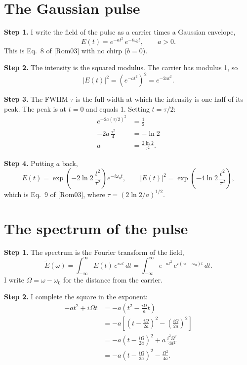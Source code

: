 \documentclass[11pt]{article}
\begin{document}
\section{The Gaussian pulse}
\textbf{Step 1.} I write the field of the pulse as a carrier times a Gaussian envelope,
\begin{equation}E(t) = e^{-at^2}\,e^{-i\omega_0t},\qquad a > 0 .\end{equation}
This is Eq.~8 of [Rom03] with no chirp ($b = 0$).

\textbf{Step 2.} The intensity is the squared modulus. The carrier has modulus 1, so
\begin{equation}|E(t)|^2 = \left(e^{-at^2}\right)^2 = e^{-2at^2} .\end{equation}

\textbf{Step 3.} The FWHM $\tau$ is the full width at which the intensity is one half of its peak. The peak is at
$t = 0$ and equals 1. Setting $t = \tau/2$:
\begin{align}e^{-2a(\tau/2)^2} &= \tfrac12\\ -2a\,\frac{\tau^2}{4} &= -\ln 2\\ a &= \frac{2\ln 2}{\tau^2} .\end{align}

\textbf{Step 4.} Putting $a$ back,
\begin{equation}E(t) = \exp\!\left(-2\ln 2\,\frac{t^2}{\tau^2}\right)e^{-i\omega_0t},\qquad
|E(t)|^2 = \exp\!\left(-4\ln 2\,\frac{t^2}{\tau^2}\right) ,\label{eq:pulse}\end{equation}
which is Eq.~9 of [Rom03], where $\tau = (2\ln 2/a)^{1/2}$.

\section{The spectrum of the pulse}
\textbf{Step 1.} The spectrum is the Fourier transform of the field,
\begin{equation}\tilde E(\omega) = \int_{-\infty}^{\infty}E(t)\,e^{i\omega t}\,dt
= \int_{-\infty}^{\infty}e^{-at^2}\,e^{i(\omega-\omega_0)t}\,dt .\end{equation}
I write $\Omega = \omega - \omega_0$ for the distance from the carrier.

\textbf{Step 2.} I complete the square in the exponent:
\begin{align}-at^2 + i\Omega t &= -a\left(t^2 - \frac{i\Omega}{a}t\right)\\
&= -a\left[\left(t - \frac{i\Omega}{2a}\right)^2 - \left(\frac{i\Omega}{2a}\right)^2\right]\\
&= -a\left(t - \frac{i\Omega}{2a}\right)^2 + a\,\frac{i^2\Omega^2}{4a^2}\\
&= -a\left(t - \frac{i\Omega}{2a}\right)^2 - \frac{\Omega^2}{4a} .\end{align}
\end{document}
